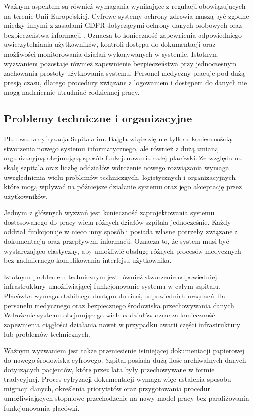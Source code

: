 Ważnym aspektem są również wymagania wynikające z regulacji obowiązujących na terenie Unii Europejskiej. Cyfrowe systemy ochrony zdrowia muszą być zgodne między innymi z zasadami GDPR dotyczącymi ochrony danych osobowych oraz bezpieczeństwa informacji \cite{EU_eHealth_2024}. Oznacza to konieczność zapewnienia odpowiedniego uwierzytelniania użytkowników, kontroli dostępu do dokumentacji oraz możliwości monitorowania działań wykonywanych w systemie. 
Istotnym wyzwaniem pozostaje również zapewnienie bezpieczeństwa przy jednoczesnym zachowaniu prostoty użytkowania systemu. Personel medyczny pracuje pod dużą presją czasu, dlatego procedury związane z logowaniem i dostępem do danych nie mogą nadmiernie utrudniać codziennej pracy.
\subsection{Problemy techniczne i organizacyjne}
Planowana cyfryzacja Szpitala im. Bajgla wiąże się nie tylko z koniecznością stworzenia nowego systemu informatycznego, ale również z dużą zmianą organizacyjną obejmującą sposób funkcjonowania całej placówki. Ze względu na skalę szpitala oraz liczbę oddziałów wdrożenie nowego rozwiązania wymaga uwzględnienia wielu problemów technicznych, logistycznych i organizacyjnych, które mogą wpływać na późniejsze działanie systemu oraz jego akceptację przez użytkowników.

Jednym z głównych wyzwań jest konieczność zaprojektowania systemu dostosowanego do pracy wielu różnych działów szpitala jednocześnie. Każdy oddział funkcjonuje w nieco inny sposób i posiada własne potrzeby związane z dokumentacją oraz przepływem informacji. Oznacza to, że system musi być wystarczająco elastyczny, aby umożliwić obsługę różnych procesów medycznych bez nadmiernego komplikowania interfejsu użytkownika.

Istotnym problemem technicznym jest również stworzenie odpowiedniej infrastruktury umożliwiającej funkcjonowanie systemu w całym szpitalu. Placówka wymaga stabilnego dostępu do sieci, odpowiednich urządzeń dla personelu medycznego oraz bezpiecznego środowiska przechowywania danych. 
Wdrożenie systemu obejmującego wiele oddziałów oznacza konieczność zapewnienia ciągłości działania nawet w przypadku awarii części infrastruktury lub problemów technicznych. 

Ważnym wyzwaniem jest także przeniesienie istniejącej dokumentacji papierowej do nowego środowiska cyfrowego. Szpital posiada dużą ilość archiwalnych danych dotyczących pacjentów, które przez lata były przechowywane w formie tradycyjnej. Proces cyfryzacji dokumentacji wymaga więc ustalenia sposobu migracji danych, określenia priorytetów oraz przygotowania procedur umożliwiających stopniowe przechodzenie na nowy model pracy bez paraliżowania funkcjonowania placówki.

